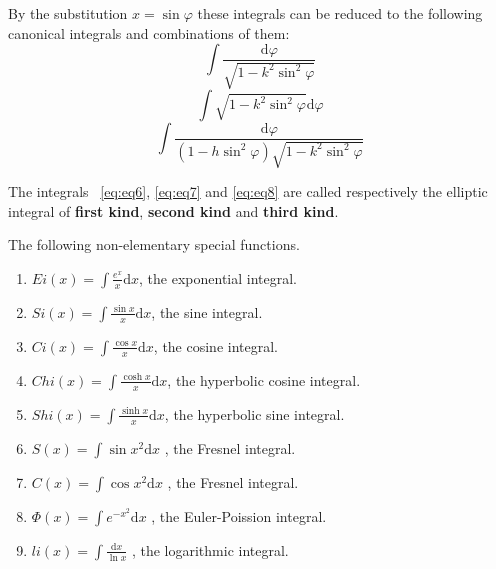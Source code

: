 \documentclass[a4paper,12pt]{article} %
\begin{document}
By the substitution $x = \sin \varphi$ these integrals can be reduced to 
the following canonical integrals and combinations of them:
\begin{equation}
    \int \frac{\mathrm{d}\varphi}{\sqrt{1-k^2\sin^2\varphi}}
    \label{eq:eq6}
\end{equation}
\begin{equation}
    \int \sqrt{1 - k^2\sin^2\varphi}\mathrm{d}\varphi
    \label{eq:eq7}
\end{equation}
\begin{equation}
    \int \frac{\mathrm{d}\varphi}{(1-h\sin^2\varphi)\sqrt{1-k^2\sin^2\varphi}}
    \label{eq:eq8}
\end{equation}

The integrals ~\ref{eq:eq6}, \ref{eq:eq7} and \ref{eq:eq8} are 
called respectively the elliptic integral of \textbf{first kind}, 
\textbf{second kind} and \textbf{third kind}.

The following non-elementary special functions.
\begin{enumerate}
    \normalfont
    \item $\displaystyle Ei(x) = \int \frac{e^x}{x}\mathrm{d}x $,
        the exponential integral.
    \item $ \displaystyle Si(x) = \int \frac{\sin x}{x}\mathrm{d}x$,
        the sine integral.
    \item $\displaystyle Ci(x) = \int \frac{\cos x}{x}\mathrm{d}x$,
        the cosine integral.
    \item $\displaystyle Chi(x) = \int \frac{\cosh x}{x}\mathrm{d}x $,
        the hyperbolic cosine integral.
    \item $\displaystyle Shi(x) = \int \frac{\sinh x}{x}\mathrm{d}x $,
        the hyperbolic sine integral.
    \item $\displaystyle S(x) = \int \sin x^2\mathrm{d}x$ , the Fresnel integral.
    \item $\displaystyle C(x) = \int \cos x^2\mathrm{d}x$ , the Fresnel integral.
    \item $\displaystyle \Phi(x) = \int e^{-x^2}\mathrm{d}x$ , 
        the Euler-Poission integral.
    \item $\displaystyle li(x) = \int \frac{\mathrm{d}x}{\ln x}$ ,
        the logarithmic integral.
\end{enumerate}
\end{document}
